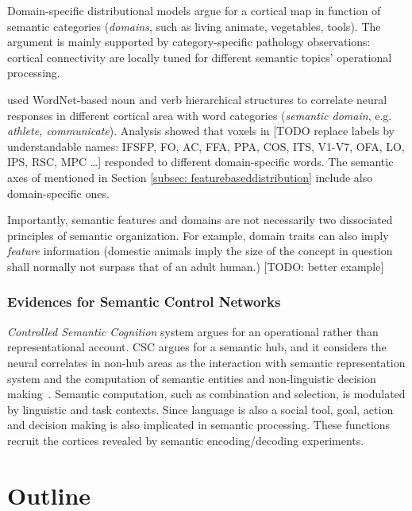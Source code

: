 Domain-specific distributional models \parencite{damasioNeuralBasisLexical1996, damasioNeuralSystemsWord2004, mahonWhatDrivesOrganization2011} argue for a cortical map in function of semantic categories (\emph{domains}, such as living animate, vegetables, tools). The argument is mainly supported by category-specific pathology observations: cortical connectivity are locally tuned for different semantic topics' operational processing. 

\textcite{huthContinuousSemanticSpace2012} used WordNet-based noun and verb hierarchical structures to correlate neural responses in different cortical area with word categories (\emph{semantic domain}, e.g. \emph{athlete, communicate}). Analysis showed that voxels in [TODO replace labels by understandable names: IFSFP, FO, AC, FFA, PPA, COS, ITS, V1-V7, OFA, LO, IPS, RSC, MPC \dots ] responded to different domain-specific words. The semantic axes of \textcite{huthNaturalSpeechReveals2016} mentioned in Section \ref{subsec: featurebaseddistribution} include also domain-specific ones.

Importantly, semantic features and domains are not necessarily two dissociated principles of semantic organization. For example, domain traits can also imply \emph{feature} information (domestic animals imply the size of the concept in question shall normally not surpass that of an adult human.) [TODO: better example]

\subsubsection{Evidences for Semantic Control Networks}
\emph{Controlled Semantic Cognition} \parencite{ralphNeuralComputationalBases2017} system argues for an operational rather than representational account. CSC argues for a semantic hub\parencite{pattersonWhereYouKnow2007}, and it considers the neural correlates in non-hub areas as the interaction with semantic representation system and the computation of semantic entities and non-linguistic decision making~\parencite{fusterUpperProcessingStages2004}. Semantic computation, such as combination and selection, is modulated by linguistic and task contexts. Since language is also a social tool, goal, action and decision making is also implicated in semantic processing. These functions recruit the cortices revealed by semantic encoding/decoding experiments. 

\section{Outline}

